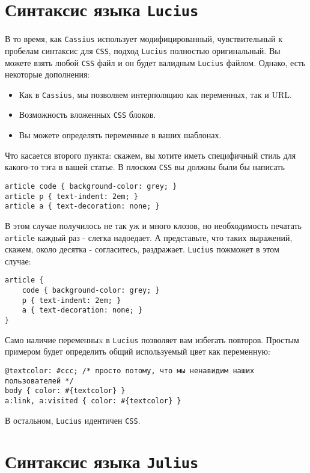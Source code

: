 \section{Синтаксис языка \texttt{Lucius}}
В то время, как \texttt{Cassius} использует модифицированный, чувствительный к пробелам 
синтаксис для \texttt{CSS}, подход \texttt{Lucius} полностью оригинальный. Вы можете взять любой \texttt{CSS}
файл и он будет валидным \texttt{Lucius} файлом. Однако, есть некоторые дополнения:

\begin{itemize}
\item Как в \texttt{Cassius}, мы позволяем интерполяцию как переменных, так и URL.
\item Возможность вложенных \texttt{CSS} блоков.
\item Вы можете определять переменные в ваших шаблонах.
\end{itemize}

Что касается второго пункта: скажем, вы хотите иметь специфичный стиль для 
какого-то тэга в вашей статье. В плоском \texttt{CSS} вы должны были бы написать

\begin{lstlisting}
article code { background-color: grey; }
article p { text-indent: 2em; }
article a { text-decoration: none; }
\end{lstlisting}

В этом случае получилось не так уж и много клозов, но необходимость печатать
\texttt{article} каждый раз - слегка надоедает. А представьте, что таких выражений, 
скажем, около десятка - согласитесь, раздражает.
\texttt{Lucius} пожможет в этом случае:

\begin{lstlisting}
article {
    code { background-color: grey; }
    p { text-indent: 2em; }
    a { text-decoration: none; }
}
\end{lstlisting}

Само наличие переменныx в \texttt{Lucius} позволяет вам избегать повторов. Простым примером
будет определить общий используемый цвет как переменную:

\begin{lstlisting}
@textcolor: #ccc; /* просто потому, что мы ненавидим наших пользователей */
body { color: #{textcolor} }
a:link, a:visited { color: #{textcolor} }
\end{lstlisting}

В остальном, \texttt{Lucius} идентичен \texttt{CSS}.

\section{Синтаксис языка \texttt{Julius}}

